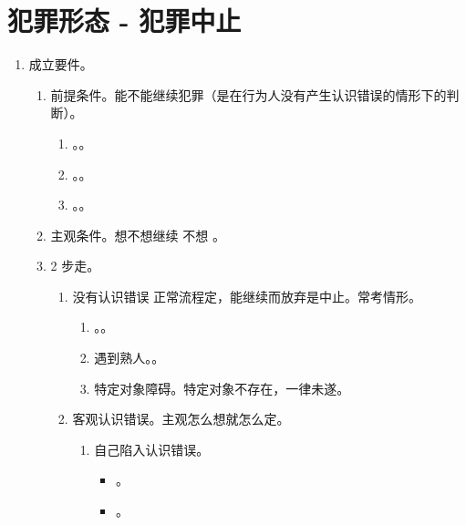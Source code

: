 \section{犯罪形态 - 犯罪中止}
\begin{enumerate}
  \item 成立要件。
        \begin{enumerate}
          \item 前提条件。能不能继续犯罪（是在行为人没有产生认识错误的情形下的判断）。
                \begin{enumerate}
                  \item {}。。
                  \item {}。。
                  \item {}。。
                \end{enumerate}
          \item 主观条件。想不想继续 \yjt 不想 \yjt {}。
          \item 2 步走。
                \begin{enumerate}
                  \item 没有认识错误 \yjt 正常流程定，能继续而放弃是中止。常考情形。
                        \begin{enumerate}
                          \item {}。。
                          \item 遇到熟人。。
                          \item 特定对象障碍。特定对象不存在，一律未遂。
                        \end{enumerate}
                  \item 客观认识错误。主观怎么想就怎么定。
                        \begin{enumerate}
                          \item 自己陷入认识错误。
                                \begin{itemize}
                                  \item {}。
                                  \item {}。

\end{itemize}
\end{enumerate}
\end{enumerate}
\end{enumerate}
\end{enumerate}
